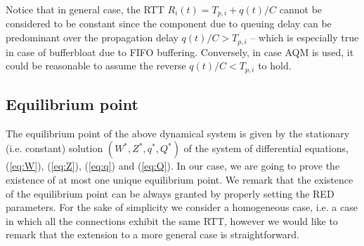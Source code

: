 \documentclass[conference]{IEEEtran}
\begin{document}
Notice that in general case, the RTT $R_i(t) = T_{p,i} + q(t)/C$ cannot be considered to be constant since  the component due to queuing delay can be predominant over the propagation delay $q(t)/C > T_{p,i} $ -- which is especially true in case of  bufferbloat due to FIFO buffering. Conversely, in case AQM is used, it could be reasonable to assume the reverse $q(t)/C < T_{p,i}$ to hold.



\subsection{Equilibrium point} 



The equilibrium point  of the above dynamical system is  given by the stationary (i.e. constant) solution  $(W^*, Z^*, q^*, Q^*)$ of the system of differential equations, (\ref{eq:W}), (\ref{eq:Z}), (\ref{eq:q}) and (\ref{eq:Q}).
In our case, we are going to prove the existence of at most one unique equilibrium point. We remark that the existence of the equilibrium point can be always granted by properly setting the RED parameters.
For the sake of simplicity we consider a homogeneous case, i.e. a case in which all the connections exhibit the same RTT, however we would like to remark that the extension to a more general case is straightforward. 
\end{document}
